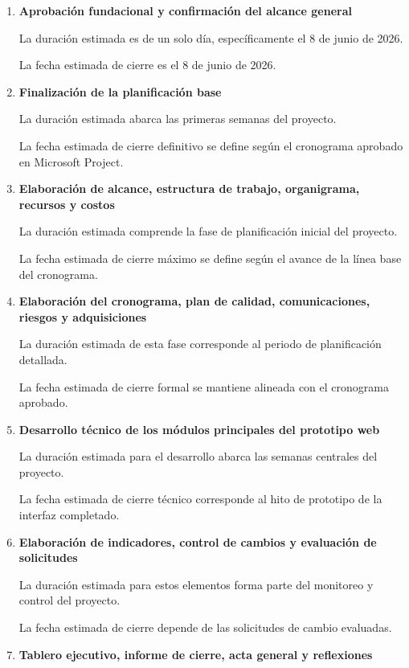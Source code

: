 \documentclass[11pt,spanish]{article}
\begin{document}
\begin{enumerate}
    \item \textbf{Aprobación fundacional y confirmación del alcance general}

    La duración estimada es de un solo día, específicamente el 8 de junio de 2026.

    La fecha estimada de cierre es el 8 de junio de 2026.

    \item \textbf{Finalización de la planificación base}

    La duración estimada abarca las primeras semanas del proyecto.

    La fecha estimada de cierre definitivo se define según el cronograma aprobado en Microsoft Project.

    \item \textbf{Elaboración de alcance, estructura de trabajo, organigrama, recursos y costos}

    La duración estimada comprende la fase de planificación inicial del proyecto.

    La fecha estimada de cierre máximo se define según el avance de la línea base del cronograma.

    \item \textbf{Elaboración del cronograma, plan de calidad, comunicaciones, riesgos y adquisiciones}

    La duración estimada de esta fase corresponde al periodo de planificación detallada.

    La fecha estimada de cierre formal se mantiene alineada con el cronograma aprobado.

    \item \textbf{Desarrollo técnico de los módulos principales del prototipo web}

    La duración estimada para el desarrollo abarca las semanas centrales del proyecto.

    La fecha estimada de cierre técnico corresponde al hito de prototipo de la interfaz completado.

    \item \textbf{Elaboración de indicadores, control de cambios y evaluación de solicitudes}

    La duración estimada para estos elementos forma parte del monitoreo y control del proyecto.

    La fecha estimada de cierre depende de las solicitudes de cambio evaluadas.

    \item \textbf{Tablero ejecutivo, informe de cierre, acta general y reflexiones}


\end{enumerate}
\end{document}
